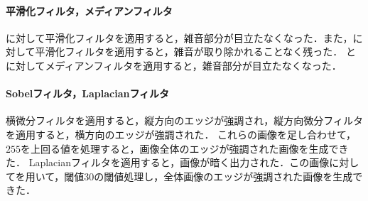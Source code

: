 \paragraph{平滑化フィルタ，メディアンフィルタ}
\wgnimg に対して平滑化フィルタを適用すると，雑音部分が目立たなくなった．また，\inimg に対して平滑化フィルタを適用すると，雑音が取り除かれることなく残った．
\wgnimg と\inimg に対してメディアンフィルタを適用すると，雑音部分が目立たなくなった．
\paragraph{Sobelフィルタ，Laplacianフィルタ}
横微分フィルタを適用すると，縦方向のエッジが強調され，縦方向微分フィルタを適用すると，横方向のエッジが強調された．
これらの画像を足し合わせて，\(255\)を上回る値を処理すると，画像全体のエッジが強調された画像を生成できた．
Laplacianフィルタを適用すると，画像が暗く出力された．この画像に対してを用いて，閾値\(30\)の閾値処理し，全体画像のエッジが強調された画像を生成できた．
